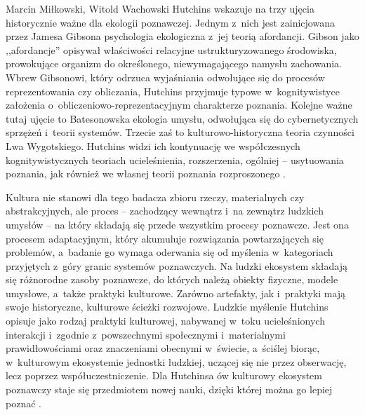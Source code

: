 \begin{artplenv2auth}{Marcin Miłkowski, Witold Wachowski}
Hutchins wskazuje na trzy ujęcia historycznie ważne dla ekologii poznawczej. Jednym z~nich jest zainicjowana przez Jamesa Gibsona psychologia ekologiczna z~jej teorią afordancji. Gibson jako ,,afordancje'' opisywał właściwości relacyjne ustrukturyzowanego środowiska, prowokujące organizm do określonego, niewymagającego namysłu zachowania. Wbrew Gibsonowi, który odrzuca wyjaśniania odwołujące się do procesów reprezentowania czy obliczania, Hutchins przyjmuje typowe w~kognitywistyce założenia o~obliczeniowo-reprezentacyjnym charakterze poznania. Kolejne ważne tutaj ujęcie to Batesonowska ekologia umysłu, odwołująca się do cybernetycznych sprzężeń i~teorii systemów. Trzecie zaś to kulturowo-historyczna teoria czynności Lwa Wygotskiego. Hutchins widzi ich kontynuację we współczesnych kognitywistycznych teoriach ucieleśnienia, rozszerzenia, ogólniej -- usytuowania poznania, jak również we własnej teorii poznania rozproszonego
\parencite[][s.~707–712]{hutchins_cognitive_2010}.%


Kultura nie stanowi dla tego badacza zbioru rzeczy, materialnych czy abstrakcyjnych, ale proces -- zachodzący wewnątrz i~na zewnątrz ludzkich umysłów -- na który składają się przede wszystkim procesy poznawcze. Jest ona procesem adaptacyjnym, który akumuluje rozwiązania powtarzających się problemów, a~badanie go wymaga oderwania się od myślenia w~kategoriach przyjętych z~góry granic systemów poznawczych. Na ludzki ekosystem składają się różnorodne zasoby poznawcze, do których należą obiekty fizyczne, modele umysłowe, a~także praktyki kulturowe. Zarówno artefakty, jak i~praktyki mają swoje historyczne, kulturowe ścieżki rozwojowe. Ludzkie myślenie Hutchins opisuje jako rodzaj praktyki kulturowej, nabywanej w~toku ucieleśnionych interakcji i~zgodnie z~powszechnymi społecznymi i~materialnymi prawidłowościami oraz znaczeniami obecnymi w~świecie, a~ściślej biorąc, w~kulturowym ekosystemie jednostki ludzkiej, uczącej się nie przez obserwację, lecz poprzez współuczestniczenie. Dla Hutchinsa ów kulturowy ekosystem poznawczy staje się przedmiotem nowej nauki, dzięki której można go lepiej poznać
\parencites[][s.~353–355]{hutchins_cognition_1995}{hutchins_distributed_2006}{hutchins_cultural_2014}.%



\end{artplenv2auth}
